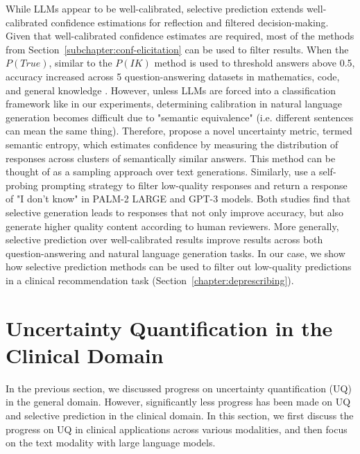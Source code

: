 While LLMs appear to be well-calibrated, selective prediction extends well-calibrated confidence estimations for reflection and filtered decision-making. Given that well-calibrated confidence estimates are required, most of the methods from Section~\ref{subchapter:conf-elicitation} can be used to filter results. When the $P(True)$, similar to the $P(IK)$ method is used to threshold answers above 0.5, accuracy increased across 5 question-answering datasets in mathematics, code, and general knowledge \citep{kadavathLanguageModelsMostly2022}. However, unless LLMs are forced into a classification framework like in our experiments, determining calibration in natural language generation becomes difficult due to "semantic equivalence" (i.e. different sentences can mean the same thing). Therefore, \citet{farquharDetectingHallucinationsLarge2024} propose a novel uncertainty metric, termed semantic entropy, which estimates confidence by measuring the distribution of responses across clusters of semantically similar answers. This method can be thought of as a sampling approach over text generations. Similarly, \citet{renSelfEvaluationImprovesSelective2023} use a self-probing prompting strategy to filter low-quality responses and return a response of "I don't know" in PALM-2 LARGE and GPT-3 models. Both studies find that selective generation leads to responses that not only improve accuracy, but also generate higher quality content according to human reviewers. More generally, selective prediction over well-calibrated results improve results across both question-answering and natural language generation tasks. In our case, we show how selective prediction methods can be used to filter out low-quality predictions in a clinical recommendation task (Section~\ref{chapter:deprescribing}). 


\section{Uncertainty Quantification in the Clinical Domain}
In the previous section, we discussed progress on uncertainty quantification (UQ) in the general domain. However, significantly less progress has been made on UQ and selective prediction in the clinical domain. In this section, we first discuss the progress on UQ in clinical applications across various modalities, and then focus on the text modality with large language models. 

